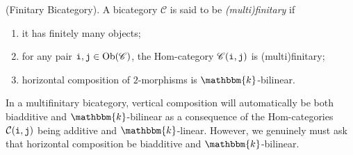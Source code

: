 \noindent\begin{definition}\textnormal{(Finitary Bicategory).} A bicategory $\mathscr{C}$ is said to be {\em (multi)finitary} if
\begin{enumerate}[label=$\bullet$, leftmargin=4\parindent]
\item it has finitely many objects;
\item for any pair $\textnormal{\texttt{i}}, \textnormal{\texttt{j}} \in \textnormal{Ob}(\mathscr{C})$, the Hom-category $\mathscr{C}(\textnormal{\texttt{i}}, \textnormal{\texttt{j}})$ is (multi)finitary;
\item horizontal composition of $2$-morphisms is %
$\mathbbm{k}$-bilinear.\\
\end{enumerate}
\end{definition}


\noindent In a multifinitary bicategory, vertical composition will automatically be both biadditive and $\mathbbm{k}$-bilinear as a consequence of the Hom-categories $\mathcal{C}(\textnormal{\texttt{i}}, \textnormal{\texttt{j}})$ being additive and $\mathbbm{k}$-linear. However, we genuinely must ask that horizontal composition be biadditive and $\mathbbm{k}$-bilinear.\\

